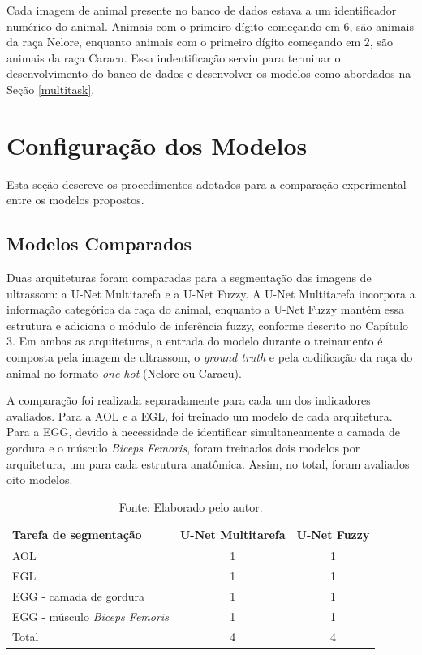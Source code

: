 Cada imagem de animal presente no banco de dados estava a um identificador numérico do animal. Animais com o primeiro dígito começando em $6$, são animais da raça Nelore, enquanto animais com o primeiro dígito começando em $2$, são animais da raça Caracu. Essa indentificação serviu para terminar o desenvolvimento do banco de dados e desenvolver os modelos como abordados na Seção \ref{multitask}.


\section{Configuração dos Modelos}

Esta seção descreve os procedimentos adotados para a comparação experimental entre os modelos propostos.

\subsection{Modelos Comparados}

Duas arquiteturas foram comparadas para a segmentação das imagens de ultrassom: a U-Net Multitarefa e a U-Net Fuzzy. A U-Net Multitarefa incorpora a informação categórica da raça do animal, enquanto a U-Net Fuzzy mantém essa estrutura e adiciona o módulo de inferência fuzzy, conforme descrito no Capítulo 3. Em ambas as arquiteturas, a entrada do modelo durante o treinamento é composta pela imagem de ultrassom, o \textit{ground truth} e pela codificação da raça do animal no formato \textit{one-hot} (Nelore ou Caracu).

A comparação foi realizada separadamente para cada um dos indicadores avaliados. Para a AOL e a EGL, foi treinado um modelo de cada arquitetura. Para a EGG, devido à necessidade de identificar simultaneamente a camada de gordura e o músculo \textit{Biceps Femoris}, foram treinados dois modelos por arquitetura, um para cada estrutura anatômica. Assim, no total, foram avaliados oito modelos.

\begin{table}[H]
    \centering
    \caption{Quantidade de modelos desenvolvidos para cada medida.}
    \begin{tabular}{lcc}
        \hline
        \textbf{Tarefa de segmentação} & \textbf{U-Net Multitarefa} & \textbf{U-Net Fuzzy} \\
        \hline
        AOL & 1 & 1 \\
        \hline
        EGL & 1 & 1 \\
        \hline
        EGG - camada de gordura & 1 & 1 \\
        \hline
        EGG - músculo \textit{Biceps Femoris} & 1 & 1 \\
        \hline
        Total & 4 & 4 \\
        \hline
    \end{tabular}
    \caption*{Fonte: Elaborado pelo autor.}
    \label{tab:modelos_comparados}
\end{table}

